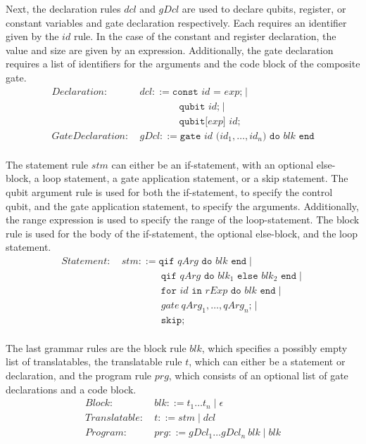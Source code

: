 Next, the declaration rules $dcl$ and $gDcl$ are used to declare qubits, register, or constant variables and gate declaration respectively. Each requires an identifier given by the $id$ rule. In the case of the constant and register declaration, the value and size are given by an expression. Additionally, the gate declaration requires a list of identifiers for the arguments and the code block of the composite gate.
\begin{align*}
    Declaration: \ & dcl ::= \texttt{const } id \texttt{ = } exp \texttt{;} \mid \\
                 & \quad \quad \quad \quad \texttt{qubit } id \texttt{;} \mid \\
                 & \quad \quad \quad \quad \texttt{qubit[} exp \texttt{] } id \texttt{;}\\
    GateDeclaration: \ & gDcl::= \texttt{gate } id \texttt{ (}id_1, \dots, id_n\texttt{) do } blk \texttt{ end}\\
\end{align*}

The statement rule $stm$ can either be an if-statement, with an optional else-block, a loop statement, a gate application statement, or a skip statement. The qubit argument rule is used for both the if-statement, to specify the control qubit, and the gate application statement, to specify the arguments. Additionally, the range expression is used to specify the range of the loop-statement. The block rule is used for the body of the if-statement, the optional else-block, and the loop statement.
\begin{align*}
    Statement: \ & stm ::= \texttt{qif } qArg \texttt{ do }  blk \texttt{ end} \mid\\
                 & \quad \quad \quad \quad \texttt{qif } qArg \texttt{ do }  blk_1 \texttt{ else } blk_2 \texttt{ end} \mid\\
                 & \quad \quad \quad \quad \texttt{for } id \texttt{ in } rExp \texttt{ do } blk \texttt{ end} \mid \\
                 & \quad \quad \quad \quad gate \ qArg_1, \dots, qArg_n \texttt{;} \mid \\
                 & \quad \quad \quad \quad \texttt{skip;}\\
\end{align*}

The last grammar rules are the block rule $blk$, which specifies a possibly empty list of translatables, the translatable rule $t$, which can either be a statement or declaration, and the program rule $prg$, which consists of an optional list of gate declarations and a code block. 
\begin{align*}
    Block: \ & blk::= t_1 \dots t_n \mid \epsilon\\
    Translatable : \ & t::= stm \mid dcl\\
    Program: \ & prg ::= gDcl_1 \dots gDcl_n \ blk \mid blk 
\end{align*}

